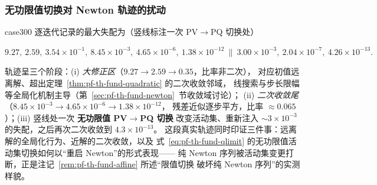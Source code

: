 \subsubsection{无功限值切换对 Newton 轨迹的扰动}
\begin{example}\label{ex:pf-th-fund-qswitch}
case300 逐迭代记录的最大失配为（竖线标注一次 PV$\to$PQ 切换处）
\begin{center}\footnotesize
$9.27,\ 2.59,\ 3.54{\times}10^{-1},\ 8.45{\times}10^{-3},\ 4.65{\times}10^{-6},\
1.38{\times}10^{-12}\ \big\|\ 3.00{\times}10^{-3},\ 2.04{\times}10^{-7},\
4.26{\times}10^{-13}.$
\end{center}
轨迹呈三个阶段：(i) \emph{大修正区}（$9.27\to2.59\to0.35$，比率非二次），
对应初值远离解、超出定理~\ref{thm:pf-th-fund-quadratic} 的二次收敛邻域，
线搜索与步长限幅等全局化机制主导（第~\ref{sec:pf-th-fund-newton}~节收敛域讨论）；
(ii) \emph{二次收敛尾}（$8.45{\times}10^{-3}\to4.65{\times}10^{-6}\to1.38{\times}10^{-12}$，
残差近似逐步平方，比率 $\approx0.065$）；(iii) 竖线处一次 \textbf{无功限值 PV$\to$PQ 切换}
改变活动集、重新注入 $\sim3\times10^{-3}$ 的失配，之后再次二次收敛到 $4.3\times10^{-13}$。
这段真实轨迹同时印证三件事：远离解的全局化行为、近解的二次收敛，以及
式~\eqref{eq:pf-th-fund-qlimit} 的无功限值活动集切换如何以“重启 Newton”的形式表现——
纯 Newton 序列被活动集变更打断，正是注记~\ref{rem:pf-th-fund-affine} 所述“限值切换
破坏纯 Newton 序列”的实测样貌。
\end{example}

